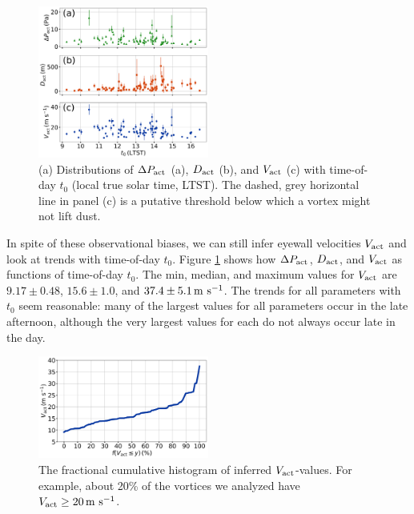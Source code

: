 \documentclass{aastex63}
\begin{document}
\begin{figure}
    \centering
    \includegraphics[width=0.5\textwidth]{figures/all_actual_values_vs_t0.png}
    \caption{(a) Distributions of $\Delta P_{\rm act}$ (a), $D_{\rm act}$ (b), and $V_{\rm act}$ (c) with time-of-day $t_0$ (local true solar time, LTST). The dashed, grey horizontal line in panel (c) is a putative threshold below which a vortex might not lift dust.}
    \label{fig:all_actual_values_vs_t0}
\end{figure}

In spite of these observational biases, we can still infer eyewall velocities $V_{\rm act}$ and look at trends with time-of-day $t_0$. Figure \ref{fig:all_actual_values_vs_t0} shows how $\Delta P_{\rm act}$, $D_{\rm act}$, and $V_{\rm act}$ as functions of time-of-day $t_0$. The min, median, and maximum values for $V_{\rm act}$ are $9.17\pm0.48$, $15.6\pm1.0$, and $37.4\pm5.1\,{\rm m\ s^{-1}}$. The trends for all parameters with $t_0$ seem reasonable: many of the largest values for all parameters occur in the late afternoon, although the very largest values for each do not always occur late in the day. 

\begin{figure}
    \centering
    \includegraphics[width=0.5\textwidth]{figures/cum_hist_Vact.png}
    \caption{The fractional cumulative histogram of inferred $V_{\rm act}$-values. For example, about 20\% of the vortices we analyzed have $V_{\rm act} \geq 20\,{\rm m\ s^{-1}}$.}
    \label{fig:cum_hist_Vact}
\end{figure}
\end{document}
